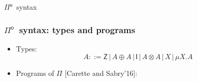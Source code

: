\documentclass[12pt,t]{beamer}
\newcommand{\Pio}{\ensuremath{\mathsf{\Pi}^{\mathsf{o}}}}
\newcommand{\Ty}{\mathsf{Ty}}
\newcommand{\Var}{\mathsf{Var}}
\newcommand{\Z}{\mathsf{Z}}
\newcommand{\I}{\mathsf{I}}
\begin{document}
\begin{frame}[c]
  \begin{center}
    \Huge \Pio\ syntax
  \end{center}
\end{frame}


\begin{frame}
  
  \frametitle{\Pio\ syntax: types and programs}
    \begin{itemize}
    \item Types:
    \[
    A ::= \Z \, | \,A \oplus A \, | \,\I \,| \,A \otimes A \,| \,X \,|
    \,\mu X.A
    \]
    \pause
  \item Programs of $\Pi$ [Carette and Sabry'16]:


\end{itemize}
\end{frame}
\end{document}
